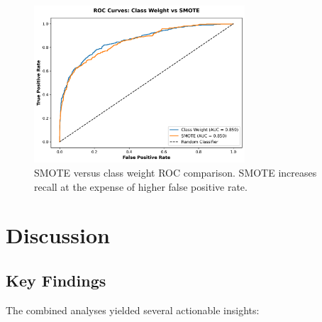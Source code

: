 \documentclass[12pt]{article}
\begin{document}
\begin{figure}[H]
\centering
\includegraphics[width=0.7\textwidth]{img/25_smote_roc_comparison.png}
\caption{SMOTE versus class weight ROC comparison. SMOTE increases recall at the expense of higher false positive rate.}
\label{fig:smote_roc}
\end{figure}

\section{Discussion}
\subsection{Key Findings}
The combined analyses yielded several actionable insights:
\end{document}
